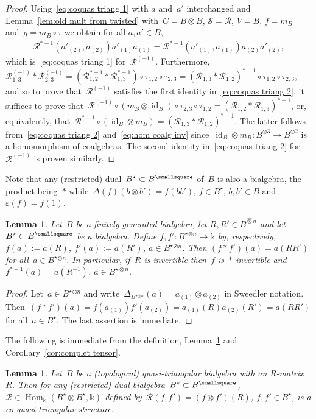 \documentclass[12pt, reqno]{amsart}
\newcommand{\wh}[1]{\widehat{#1}}
\newtheorem{lemma}[theorem]{Lemma}
\theoremstyle{definition}
\numberwithin{equation}{section}
\newcommand{\tensor}{\otimes}
\newcommand{\kk}{\mathbb{k}}\newcommand{\lie}[1]{{\mathfrak{#1}}}
\DeclareMathOperator{\id}{id}
\DeclareMathOperator{\Hom}{Hom}
\begin{document}
\begin{proof}
Using~\eqref{eq:coquas triang 1} with $a$ and~$a'$
interchanged and 
Lemma~\ref{lem:old mult from twisted} with~$C=B\tensor B$,
$\mathcal S=\mathcal R$, $V=B$,
$f=m_B$ and~$g=m_B\circ\tau$ we obtain for all $a,a'\in B$,
\begin{align*}
\mathcal R^{\ast-1}(a'_{(2)},a_{(2)})a'_{(1)}a_{(1)}
=\mathcal R^{\ast-1}(a'_{(1)},a_{(1)})a_{(2)}a'_{(2)},
\end{align*}
which is~\eqref{eq:coquas triang 1} for~$\mathcal R^{(-1)}$. Furthermore, $\mathcal R^{(-1)}_{1,3}\ast \mathcal R^{(-1)}_{2,3}=(\mathcal R^{\ast-1}_{1,2}\ast\mathcal R^{\ast-1}_{1,3})\circ\tau_{1,2}\circ\tau_{2,3}
=(\mathcal R_{1,3}\ast\mathcal R_{1,2})^{\ast-1}\circ
\tau_{1,2}\circ\tau_{2,3}$, and so to prove
that~$\mathcal R^{(-1)}$ satisfies the first 
identity in~\eqref{eq:coquas triang 2}, 
it suffices
to prove that~$\mathcal R^{(-1)}\circ (m_B\tensor\id_B)
\circ\tau_{2,3}\circ\tau_{1,2}=(\mathcal R_{1,2}\ast\mathcal R_{1,3})^{\ast-1}$, or,
equivalently, that~$\mathcal R^{\ast-1}\circ (\id_B\tensor m_B)=(\mathcal R_{1,3}\ast\mathcal R_{1,2})^{\ast-1}$. The latter
follows from~\eqref{eq:coquas triang 2} and~\eqref{eq:hom coalg inv} since~$\id_B\tensor m_B:B^{\tensor 3}\to B^{\tensor 2}$
is a homomorphism of coalgebras. The second identity in~\eqref{eq:coquas triang 2} for~$\mathcal R^{(-1)}$ is proven similarly.
\end{proof}

Note that any (restricted) dual~$B^\star\subset B^\smallsquare$ of~$B$ is also a bialgebra, the product being~$\ast$
while~$\Delta(f)(b\tensor b')=f(bb')$,
$f\in B^\star$, $b,b'\in B$ and~$\varepsilon(f)=f(1)$. 
\begin{lemma}\label{lem:natural pairing}
Let~$B$ be a finitely generated bialgebra, let
$R,R'\in B^{\wh\tensor n}$ and let~$B^\star\subset B^\smallsquare$ be a bialgebra. Define $f,f':B^\star{}^{\tensor n}\to\kk$ by, respectively,
$f(a):=a(R)$, $f'(a):=a(R')$, $a\in B^\star{}^{\tensor n}$. Then
$(f\ast f')(a)=a(RR')$ for all~$a\in B^\star{}^{\tensor n}$.
In particular, if~$R$ is invertible then~$f$ is~$\ast$-invertible and~$f^{\ast-1}(a)=a(R^{-1})$, $a\in B^{\star\tensor n}$.
\end{lemma}
\begin{proof}
Let~$a\in B^\star{}^{\tensor n}$ and 
write~$\Delta_{B^\star{}^{\tensor n}}(a)=a_{(1)}\tensor a_{(2)}$ in Sweedler notation.
Then~$(f\ast f')(a)=f(a_{(1)})f'(a_{(2)})=
a_{(1)}(R)a_{(2)}(R')=a(RR')$ for all~$a\in B^\star$. The
last assertion is immediate.
\end{proof}
The following is immediate from the definition,
Lemma~\ref{lem:natural pairing}
and Corollary~\ref{cor:complet tensor}.
\begin{lemma}
Let~$B$ be a (topological) quasi-triangular bialgebra with an R-matrix~$R$. Then for any (restricted) dual bialgebra~$B^\star\subset B^\smallsquare$,
$\mathcal R\in\Hom_\kk(B^\star\tensor B^\star,\kk)$
defined by~$\mathcal R(f,f')=(f\tensor f')(R)$,
$f,f'\in B^\star$, is a co-quasi-triangular structure.
\end{lemma}
\end{document}
